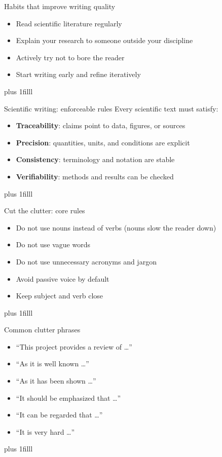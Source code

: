 \documentclass[aspectratio=169]{beamer}
\newcommand{\btVFill}{\vskip0pt plus 1filll}
\begin{document}
\begin{frame}{Habits that improve writing quality}
  \begin{itemize}
    \item Read scientific literature regularly
    \item Explain your research to someone outside your discipline
    \item Actively try not to bore the reader
    \item Start writing early and refine iteratively
  \end{itemize}
  \btVFill
\end{frame}

\begin{frame}{Scientific writing: enforceable rules}
  Every scientific text must satisfy:
  \begin{itemize}
    \item \textbf{Traceability}: claims point to data, figures, or sources
    \item \textbf{Precision}: quantities, units, and conditions are explicit
    \item \textbf{Consistency}: terminology and notation are stable
    \item \textbf{Verifiability}: methods and results can be checked
  \end{itemize}
  \btVFill
\end{frame}


\begin{frame}{Cut the clutter: core rules}
  \begin{itemize}
    \item Do not use nouns instead of verbs (nouns slow the reader down)
    \item Do not use vague words
    \item Do not use unnecessary acronyms and jargon
    \item Avoid passive voice by default
    \item Keep subject and verb close
  \end{itemize}
  \btVFill
\end{frame}

\begin{frame}{Common clutter phrases}
  \begin{itemize}
    \item ``This project provides a review of \ldots''
    \item ``As it is well known \ldots''
    \item ``As it has been shown \ldots''
    \item ``It should be emphasized that \ldots''
    \item ``It can be regarded that \ldots''
    \item ``It is very hard \ldots''
  \end{itemize}\bigskip
  \btVFill
\end{frame}
\end{document}
